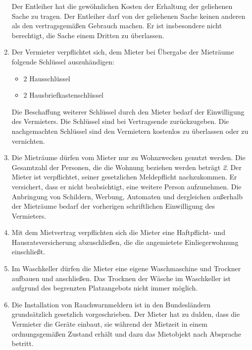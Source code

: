 \documentclass{scrreprt}[12pt,a4paper,twoside,duplex]
\begin{document}
\begin{contract}
\begin{enumerate}
Der Entleiher hat die gewöhnlichen Kosten der Erhaltung der geliehenen Sache zu tragen. Der Entleiher darf von der geliehenen Sache keinen anderen als den vertragsgemäßen Gebrauch machen. Er ist insbesondere nicht berechtigt, die Sache einem Dritten zu überlassen.
\item Der Vermieter verpflichtet sich, dem Mieter bei Übergabe der Mieträume
folgende Schlüssel auszuhändigen:
\begin{itemize}
  \color{zuBearbeiten}
  \item 2 Hausschlüssel
  \item 2 Hausbriefkastenschlüssel
\end{itemize}
Die Beschaffung weiterer Schlüssel durch den Mieter bedarf der Einwilligung des
Vermieters. Die Schlüssel sind bei Vertragsende zurückzugeben. Die nachgemachten Schlüssel sind den Vermietern kostenlos zu überlassen oder zu vernichten.
\item Die Mieträume dürfen vom Mieter nur zu Wohnzwecken genutzt werden. Die
Gesamtzahl der Personen, die die Wohnung beziehen werden beträgt \textsl{2}.
Der Mieter ist verpflichtet, seiner gesetzlichen Meldepflicht nachzukommen. Er versichert, dass er nicht beabsichtigt, eine weitere Person aufzunehmen. Die
Anbringung von Schildern, Werbung, Automaten und dergleichen außerhalb der
Mieträume bedarf der vorherigen schriftlichen Einwilligung des Vermieters.
\item Mit dem Mietvertrag verpflichten sich die Mieter eine Haftpflicht- und Hausratsversicherung abzuschließen, die die angemietete Einliegerwohnung einschließt.
\item Im Waschkeller dürfen die Mieter eine eigene Waschmaschine und Trockner aufbauen und anschließen. Das Trocknen der Wäsche im Waschkeller ist aufgrund des begrenzten Platzangebots nicht immer möglich.
\item Die Installation von Rauchwarnmeldern ist in den Bundesländern grundsätzlich gesetzlich vorgeschrieben. Der Mieter hat zu dulden, dass die Vermieter die Geräte einbaut, sie während der Mietzeit in einem ordnungsgemäßen Zustand erhält und dazu das Mietobjekt nach Absprache betritt.
\end{enumerate}
\end{contract}
\end{document}
